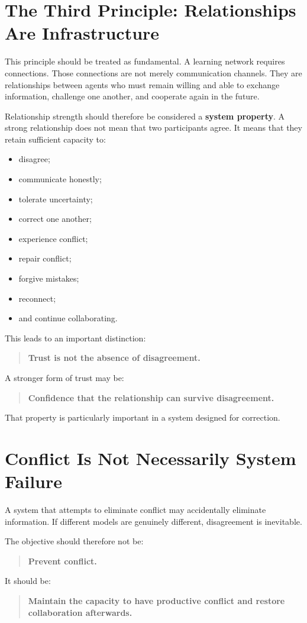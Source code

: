\documentclass{article}
\begin{document}
\section{The Third Principle: Relationships Are Infrastructure}
This principle should be treated as fundamental. A learning network requires connections. Those connections are not merely communication channels. They are relationships between agents who must remain willing and able to exchange information, challenge one another, and cooperate again in the future.

Relationship strength should therefore be considered a \textbf{system property}. A strong relationship does not mean that two participants agree. It means that they retain sufficient capacity to:
\begin{itemize}
    \item disagree;
    \item communicate honestly;
    \item tolerate uncertainty;
    \item correct one another;
    \item experience conflict;
    \item repair conflict;
    \item forgive mistakes;
    \item reconnect;
    \item and continue collaborating.
\end{itemize}

This leads to an important distinction:
\begin{quote}
    \textbf{Trust is not the absence of disagreement.}
\end{quote}

A stronger form of trust may be:
\begin{quote}
    \textbf{Confidence that the relationship can survive disagreement.}
\end{quote}

That property is particularly important in a system designed for correction.

\section{Conflict Is Not Necessarily System Failure}
A system that attempts to eliminate conflict may accidentally eliminate information. If different models are genuinely different, disagreement is inevitable.

The objective should therefore not be:
\begin{quote}
    \textbf{Prevent conflict.}
\end{quote}
It should be:
\begin{quote}
    \textbf{Maintain the capacity to have productive conflict and restore collaboration afterwards.}
\end{quote}
\end{document}
